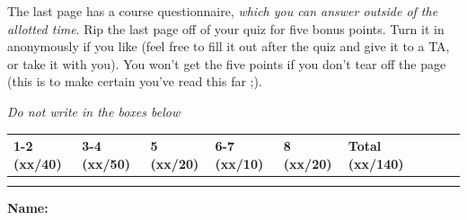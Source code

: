 \documentclass[11pt]{article}
\newcounter{answer}
\begin{document}
\begin{center}
\begin{boxedminipage}[h]{6in}
\vspace{.05in} 
The last page has a course questionnaire, {\em which you can
answer outside of the allotted time}.  Rip the last page off of your
quiz for five bonus points.  Turn it in anonymously if you like (feel
free to fill it out after the quiz and give it to a TA, or take it with
you).  
You
won't get the five points if you don't tear off the page (this is to
make certain you've read this far ;).
\fi 

\end{boxedminipage}
\end{center}
\vspace*{0.05in}
\begin{center}
{\it Do not write in the boxes below}
\end{center}

\begin{center}
\begin{tabular}{|l|l|l|l|l|l|l|l|l|} \hline \hline
{\bf 1-2 (xx/40)} & {\bf 3-4 (xx/50)} & {\bf 5 (xx/20)} & {\bf 6-7
  (xx/10)} & {\bf 8 (xx/20)} & {\bf Total
  (xx/140)}  \\ \hline 
& & & & & \\ 
& & & & & \\ \hline \hline
\end{tabular}
\end{center}

\vspace{.1in}
{\bf\Large{Name:}}

\newpage
\pagestyle{fancy}


%
%






\label{lastpage}
\end{document}
